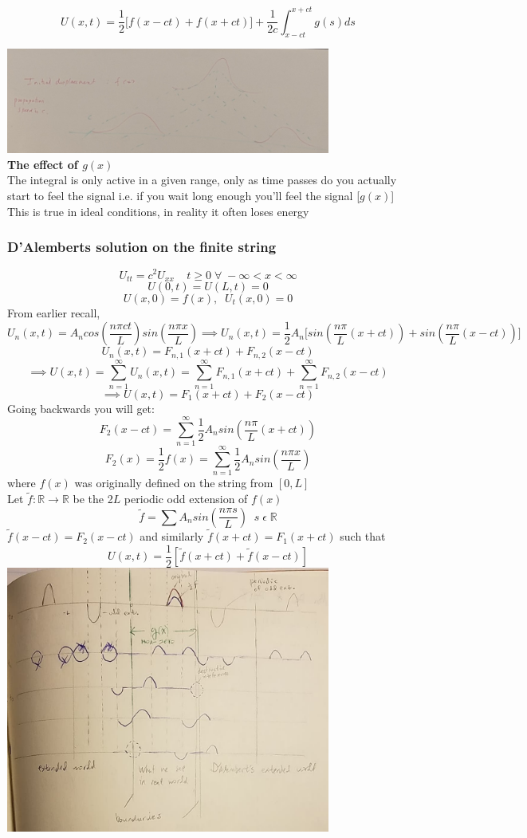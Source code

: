 \documentclass[11pt]{article}
\theoremstyle{definition}
\newcommand{\R}{\mathbb{R}}
\begin{document}
$$U(x,t) = \frac{1}{2}\Big[f(x-ct) + f(x+ct)\Big] + \frac{1}{2c}\int^{x+ct}_{x-ct} g(s) ds$$

\includegraphics[width=0.8\textwidth]{superimposed.jpg}\\
\textbf{The effect of $g(x)$}\\
The integral is only active in a given range, only as time passes do you actually start to feel the signal i.e. if you wait long enough you'll feel the signal [$g(x)$]\\
This is true in ideal conditions, in reality it often loses energy\\
\subsubsection{D'Alemberts solution on the finite string}
$$U_{tt} = c^2 U_{xx} \;\;\;\; t \geq 0 \; \forall \; -\infty < x < \infty$$
$$U(0,t) = U(L,t) = 0$$
$$U(x,0) = f(x),\;\; U_t(x,0) = 0$$
From earlier recall,
$$U_n(x,t) = A_n cos(\frac{n\pi ct}{L}) sin(\frac{n \pi x}{L}) \implies U_n(x,t) = \frac{1}{2}A_n\Big[sin(\frac{n\pi}{L}(x+ct)) + sin(\frac{n\pi}{L}(x-ct)) \Big]$$
$$U_n(x,t) = F_{n,1}(x+ct) + F_{n,2}(x-ct)$$
$$\implies U(x,t) = \sum_{n=1}^\infty U_n(x,t) = \sum_{n=1}^\infty F_{n,1}(x+ct) + \sum_{n=1}^\infty F_{n,2}(x-ct)$$
$$\implies U(x,t) = F_1(x+ct) + F_2(x-ct)$$
Going backwards you will get:\\
$$F_2(x-ct) = \sum_{n=1}^\infty \frac{1}{2}A_n sin(\frac{n\pi}{L}(x+ct))$$
$$F_2(x) = \frac{1}{2}f(x) = \sum_{n=1}^\infty \frac{1}{2}A_n sin(\frac{n\pi x}{L})$$
where $f(x)$ was originally defined on the string from $[0,L]$\\
Let $\widetilde{f}: \R \to \R$ be the 2$L$ periodic odd extension of $f(x)$\\
$$\widetilde{f} = \sum A_n sin(\frac{n \pi s}{L})\;\; s\;\epsilon\;\R$$
$\widetilde{f}(x-ct) = F_2(x-ct)$ and similarly $\widetilde{f}(x+ct) = F_1(x+ct)$ such that
$$U(x,t) = \frac{1}{2}[\widetilde{f}(x+ct) + \widetilde{f}(x-ct)]$$
\includegraphics[width=0.8\textwidth]{48360299_943482375858391_8085245058200109056_n.jpg}
\end{document}
